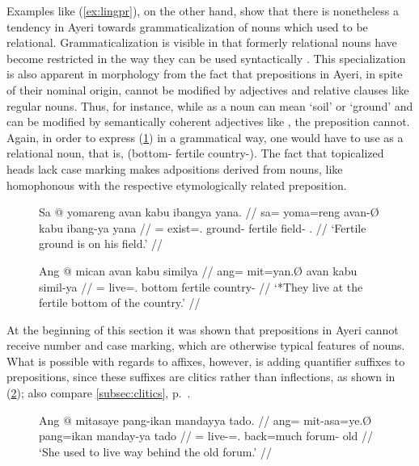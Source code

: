 Examples like (\ref{ex:lingpr}), on the other hand, show that there is
nonetheless a tendency in Ayeri towards grammaticalization of nouns which used
to be relational. Grammaticalization is visible in that formerly relational
nouns have become restricted in the way they can be used syntactically
\citep[174]{lehmann2015}. This specialization is also apparent in morphology
from the fact that prepositions in Ayeri, in spite of their nominal origin,
cannot be modified by adjectives and relative clauses like regular nouns. Thus,
for instance, while  as a noun can mean `soil' or `ground' and
can be modified by semantically coherent adjectives like
, the preposition  cannot. Again, in
order to express (\ref{ex:avanprep}) in a grammatical way, one would have to
use  as a relational noun, that is, 
(bottom-\Loc{} fertile country-\Gen{}). The fact that topicalized heads lack
case marking makes adpositions derived from nouns, like 
homophonous with the respective etymologically related preposition.

\begin{figure}[h]
\pex
\a\label{ex:avannn}\begingl
	\gla Sa @ yomareng avan kabu ibangya yana. //
	\glb sa= yoma=reng avan-Ø kabu ibang-ya yana //
	\glc \PatT{}= exist=\TsgI.\AargI{} ground-\Top{} fertile field-\Loc{} 
		\TsgM{}.\Gen{} //
	\glft `Fertile ground is on his field.' //
\endgl

\a\label{ex:avanprep}\ljudge* \begingl
	\gla Ang @ mican avan kabu similya //
	\glb ang= mit=yan.Ø avan kabu simil-ya //
	\glc \AgtT{}= live=\TplM{}.\Top{} bottom fertile country-\Loc{} //
	\glft `*They live at the fertile bottom of the country.' //
\endgl
\xe
\end{figure}

At the beginning of this section it was shown that prepositions in Ayeri cannot
receive number and case marking, which are otherwise typical features of nouns.
What is possible with regards to affixes, however, is adding quantifier
suffixes to prepositions, since these suffixes are clitics rather than
inflections, as shown in (\ref{ex:prepquant}); also compare
\autoref{subsec:clitics}, p.~\pageref{clitics_quant}.

\begin{figure}[h]
\ex\label{ex:prepquant}\begingl
	\gla Ang @ mitasaye pang-ikan mandayya tado. //
	\glb ang= mit-asa=ye.Ø pang=ikan manday-ya tado //
	\glc \AgtT{}= live-\Hab{}=\TsgF{}.\Top{} back=much forum-\Loc{} old //
	\glft `She used to live way behind the old forum.' //
\endgl\xe
\end{figure}

